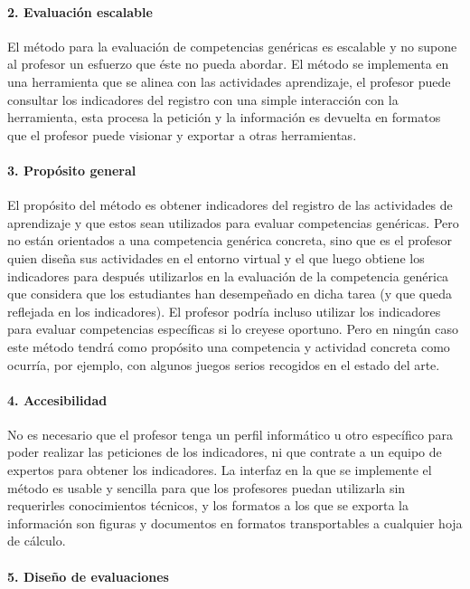 \paragraph*{2. Evaluación escalable}

El método para la evaluación de competencias genéricas es escalable y no supone al profesor un esfuerzo que éste no pueda abordar. El método se implementa en una herramienta que se alinea con las actividades aprendizaje, el profesor puede consultar los indicadores del registro con una simple interacción con la herramienta, esta procesa la petición y la información es devuelta en formatos que el profesor puede visionar y exportar a otras herramientas.

\paragraph*{3. Propósito general}

El propósito del método es obtener indicadores del registro de las actividades de aprendizaje y que estos sean utilizados para evaluar competencias genéricas. Pero no están orientados a una competencia genérica concreta, sino que es el profesor quien diseña sus actividades en el entorno virtual y el que luego obtiene los indicadores para después utilizarlos en la evaluación de la competencia genérica que considera que los estudiantes han desempeñado en dicha tarea (y que queda reflejada en los indicadores). El profesor podría incluso utilizar los indicadores para evaluar competencias específicas si lo creyese oportuno. Pero en ningún caso este método tendrá como propósito una competencia y actividad concreta como ocurría, por ejemplo, con algunos juegos serios recogidos en el estado del arte.

\paragraph*{4. Accesibilidad}

No es necesario que el profesor tenga un perfil informático u otro específico para poder realizar las peticiones de los indicadores, ni que contrate a un equipo de expertos para obtener los indicadores. La interfaz en la que se implemente el método es usable y sencilla para que los profesores puedan utilizarla sin requerirles conocimientos técnicos, y los formatos a los que se exporta la información son figuras y documentos en formatos transportables a cualquier hoja de cálculo.

\paragraph*{5. Diseño de evaluaciones}

